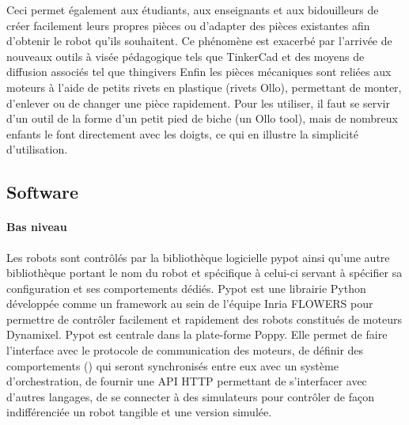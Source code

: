             Ceci permet également aux étudiants, aux enseignants et aux bidouilleurs de créer facilement leurs propres pièces ou d'adapter des pièces existantes afin d'obtenir le robot qu'ils souhaitent. Ce phénomène est exacerbé par l'arrivée de nouveaux outils à visée pédagogique tels que TinkerCad et des moyens de diffusion associés tel que thingivers%
            Enfin les pièces mécaniques sont reliées aux moteurs à l'aide de petits rivets en plastique (rivets Ollo), permettant de monter, d'enlever ou de changer une pièce rapidement. Pour les utiliser, il faut se servir d'un outil de la forme d'un petit pied de biche (un Ollo tool), mais de nombreux enfants le font directement avec les doigts, ce qui en illustre la simplicité d'utilisation.
    \subsection{Software}
        \paragraph{Bas niveau}\label{sec:pypot}
            Les robots sont contrôlés par la bibliothèque logicielle pypot ainsi qu'une autre bibliothèque portant le nom du robot et spécifique à celui-ci servant à spécifier sa configuration et ses comportements dédiés.
            Pypot est une librairie Python développée comme un framework au sein de l'équipe Inria FLOWERS pour permettre de contrôler facilement et rapidement des robots constitués de moteurs Dynamixel.
            Pypot est centrale dans la plate-forme Poppy. Elle permet de faire l’interface avec le protocole de communication des moteurs, de définir des comportements () qui seront synchronisés entre eux avec un système d’orchestration, de fournir une API HTTP permettant de s’interfacer avec d’autres langages, de se connecter à des simulateurs pour contrôler de façon indifférenciée un robot tangible et une version simulée.

